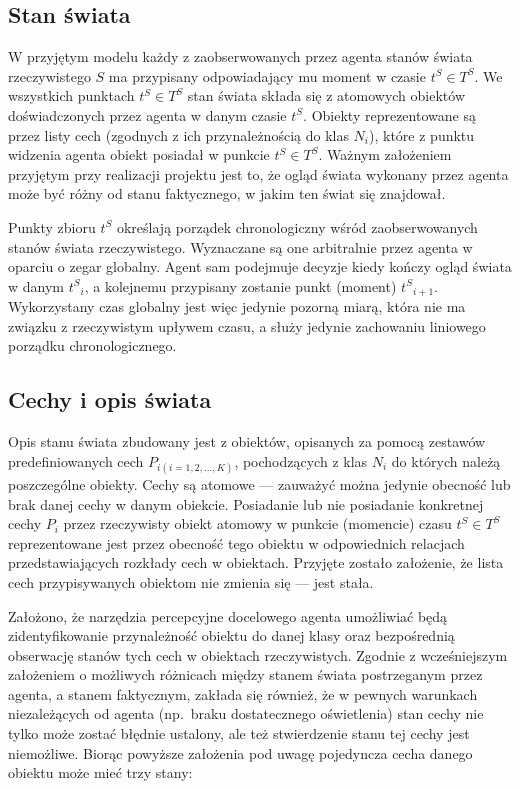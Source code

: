 	
	\subsection{Stan świata}
	
	W przyjętym modelu każdy z zaobserwowanych przez agenta stanów świata rzeczywistego $ S $ ma przypisany odpowiadający mu moment w czasie $ t^S \in T^S $. We wszystkich punktach $ t^S \in T^S $	stan świata składa się z atomowych obiektów doświadczonych przez agenta w danym czasie $ t^S $. Obiekty reprezentowane są przez listy cech (zgodnych z ich przynależnością do klas $ N_i $), które z punktu widzenia agenta obiekt posiadał w punkcie $ t^S \in T^S $. Ważnym założeniem przyjętym przy realizacji projektu jest to, że ogląd świata wykonany przez agenta może być różny od stanu faktycznego, w jakim ten świat się znajdował.
	
	
	Punkty zbioru $ t^S $ określają porządek chronologiczny wśród zaobserwowanych stanów świata rzeczywistego. Wyznaczane są one arbitralnie przez agenta w oparciu o zegar globalny. Agent sam podejmuje decyzje kiedy kończy ogląd świata w danym $ t^S{}_i $, a kolejnemu przypisany zostanie punkt (moment) $ t^S{}_{i+1} $. Wykorzystany czas globalny jest więc jedynie pozorną miarą, która nie ma związku z rzeczywistym upływem czasu, a służy jedynie zachowaniu liniowego porządku chronologicznego.
	
	
	\subsection{Cechy i opis świata}
	
	Opis stanu świata zbudowany jest z obiektów, opisanych za pomocą zestawów predefiniowanych cech $ P_{i(i=1,2,...,K)} $, pochodzących z klas $ N_i $ do których należą poszczególne obiekty. Cechy są atomowe --- zauważyć można jedynie obecność lub brak danej cechy w danym obiekcie. Posiadanie lub nie posiadanie konkretnej cechy $ P_i $ przez rzeczywisty obiekt atomowy w punkcie (momencie) czasu $ t^S \in T^S $ reprezentowane jest przez obecność tego obiektu w odpowiednich relacjach przedstawiających rozkłady cech w obiektach. Przyjęte zostało założenie, że lista cech przypisywanych obiektom nie zmienia się --- jest stała. 

	Założono, że narzędzia percepcyjne docelowego agenta umożliwiać będą zidentyfikowanie przynależność obiektu do danej klasy oraz bezpośrednią obserwację stanów tych cech w obiektach rzeczywistych. Zgodnie z wcześniejszym założeniem o możliwych różnicach między stanem świata postrzeganym przez agenta, a stanem faktycznym, zakłada się również, że w pewnych warunkach niezależących od agenta (np.\ braku dostatecznego oświetlenia) stan cechy nie tylko może zostać błędnie ustalony, ale też stwierdzenie stanu tej cechy jest niemożliwe. Biorąc powyższe założenia pod uwagę pojedyncza cecha danego obiektu może mieć trzy stany: 


